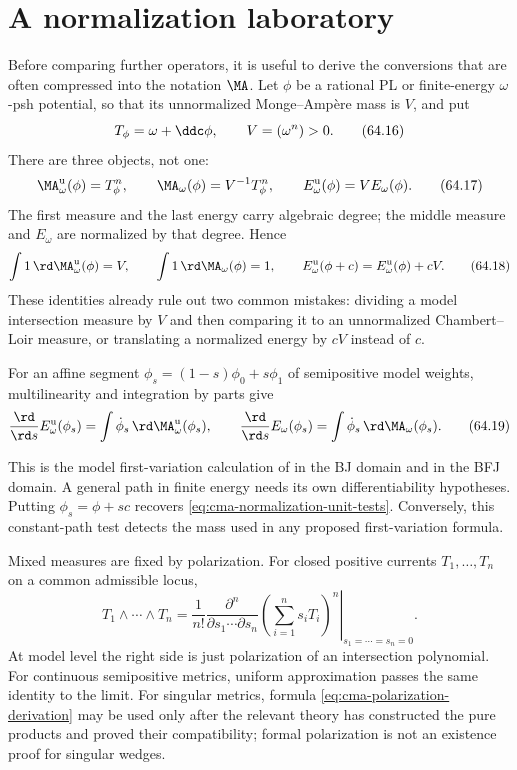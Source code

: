 \section{A normalization laboratory}
\label{sec:cma-normalization-laboratory}

Before comparing further operators, it is useful to derive the conversions
that are often compressed into the notation $\MA$.  Let $\phi$ be a
rational PL or finite-energy $\omega$-psh potential, so that its
unnormalized Monge--Amp\`ere mass is $V$, and put
\[
                        T_\phi=\omega+\ddc\phi,
                   \qquad V=(\omega^n)>0.
\tag{64.16}\label{eq:cma-normalization-current}
\]
There are three objects, not one:
\[
 \MA^{\mathrm u}_\omega(\phi)=T_\phi^n,
 \qquad
 \MA_\omega(\phi)=V^{-1}T_\phi^n,
 \qquad
 E^{\mathrm u}_\omega(\phi)=V E_\omega(\phi).
\tag{64.17}\label{eq:cma-three-normalized-objects}
\]
The first measure and the last energy carry algebraic degree; the middle
measure and $E_\omega$ are normalized by that degree.  Hence
\[
 \int 1\,\rd\MA^{\mathrm u}_\omega(\phi)=V,
 \qquad
 \int 1\,\rd\MA_\omega(\phi)=1,
 \qquad
 E^{\mathrm u}_\omega(\phi+c)
        =E^{\mathrm u}_\omega(\phi)+cV.
\tag{64.18}\label{eq:cma-normalization-unit-tests}
\]
These identities already rule out two common mistakes: dividing a model
intersection measure by $V$ and then comparing it to an unnormalized
Chambert--Loir measure, or translating a normalized energy by $cV$
instead of $c$.

\noindent\begin{minipage}{\linewidth}
For an affine segment $\phi_s=(1-s)\phi_0+s\phi_1$ of semipositive
model weights, multilinearity and integration by parts give
\[
 \frac{\rd}{\rd s}E^{\mathrm u}_\omega(\phi_s)
   =\int\dot\phi_s\,\rd\MA^{\mathrm u}_\omega(\phi_s),
 \qquad
 \frac{\rd}{\rd s}E_\omega(\phi_s)
   =\int\dot\phi_s\,\rd\MA_\omega(\phi_s).
\tag{64.19}\label{eq:cma-energy-first-variation-normalizations}
\]
\end{minipage}\par
This is the model first-variation calculation of
 in the BJ domain and
 in the BFJ domain.
A general path in finite energy needs its own differentiability hypotheses.
Putting $\phi_s=\phi+sc$ recovers
\eqref{eq:cma-normalization-unit-tests}.  Conversely, this constant-path
test detects the mass used in any proposed first-variation formula.

Mixed measures are fixed by polarization.  For closed positive currents
$T_1,\ldots,T_n$ on a common admissible locus,
\[
 T_1\wedge\cdots\wedge T_n
 =\left.\frac1{n!}
   \frac{\partial^n}{\partial s_1\cdots\partial s_n}
   \left(\sum_{i=1}^ns_iT_i\right)^n
   \right|_{s_1=\cdots=s_n=0}.
\tag{64.20}\label{eq:cma-polarization-derivation}
\]
At model level the right side is just polarization of an intersection
polynomial.  For continuous semipositive metrics, uniform approximation
passes the same identity to the limit.  For singular metrics, formula
\eqref{eq:cma-polarization-derivation} may be used only after the relevant
theory has constructed the pure products and proved their compatibility;
formal polarization is not an existence proof for singular wedges.

